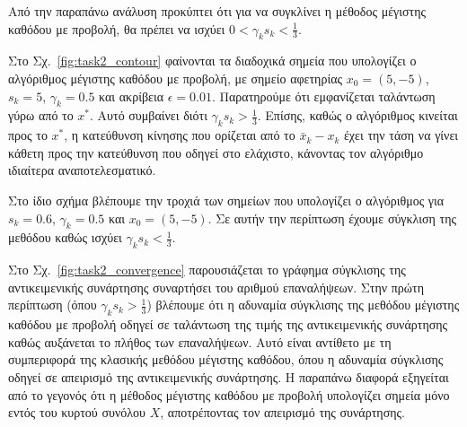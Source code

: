 \documentclass[a4paper,12pt]{article}
\begin{document}
Από την παραπάνω ανάλυση προκύπτει ότι για να συγκλίνει η μέθοδος μέγιστης καθόδου με προβολή, θα πρέπει να ισχύει 
$0 < \gamma_k s_k < \frac{1}{3}$.
 
Στο Σχ.~\ref{fig:task2_contour} φαίνονται τα διαδοχικά σημεία που υπολογίζει ο αλγόριθμος μέγιστης καθόδου με 
προβολή, με σημείο αφετηρίας $x_0 = (5, -5)$, $s_k = 5$, $\gamma_k = 0.5$ και ακρίβεια $\epsilon = 0.01$. 
Παρατηρούμε ότι εμφανίζεται ταλάντωση γύρω από το $x^*$. Αυτό συμβαίνει διότι $\gamma_k s_k > \frac{1}{3}$. Επίσης,
καθώς ο αλγόριθμος κινείται προς το $x^*$, η κατεύθυνση κίνησης που ορίζεται από το $\bar{x}_k - x_k$ έχει
την τάση να γίνει κάθετη προς την κατεύθυνση που οδηγεί στο ελάχιστο, κάνοντας τον αλγόριθμο ιδιαίτερα 
αναποτελεσματικό.

Στο ίδιο σχήμα βλέπουμε την τροχιά των σημείων που υπολογίζει ο αλγόριθμος για $s_k = 0.6$, $\gamma_k = 0.5$ και
$x_0 = (5, -5)$. Σε αυτήν την περίπτωση έχουμε σύγκλιση της μεθόδου καθώς ισχύει $\gamma_k s_k < \frac{1}{3}$.

Στο Σχ.~\ref{fig:task2_convergence} παρουσιάζεται το γράφημα σύγκλισης της αντικειμενικής συνάρτησης 
συναρτήσει του αριθμού επαναλήψεων. Στην πρώτη περίπτωση (όπου $\gamma_k s_k > \frac{1}{3}$) βλέπουμε ότι η αδυναμία 
σύγκλισης της μεθόδου μέγιστης καθόδου με προβολή οδηγεί σε ταλάντωση της τιμής της αντικειμενικής συνάρτησης καθώς
αυξάνεται το πλήθος των επαναλήψεων. Αυτό είναι αντίθετο με τη συμπεριφορά της κλασικής μεθόδου μέγιστης καθόδου, 
όπου η αδυναμία σύγκλισης οδηγεί σε απειρισμό της αντικειμενικής συνάρτησης. Η παραπάνω διαφορά εξηγείται από το 
γεγονός ότι η μέθοδος μέγιστης καθόδου με προβολή υπολογίζει σημεία μόνο εντός του κυρτού συνόλου $X$, αποτρέποντας 
τον απειρισμό της συνάρτησης.
\end{document}
